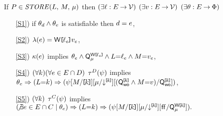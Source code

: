 \noindent
If $\aPS \in \sSTORE[\amode]{\cExp}{\aExp}$ then
$(\exists\ell:E\mathbin\rightarrow\mathcal{V})$
$(\exists v:E\mathbin\rightarrow\mathcal{V})$
$(\exists\theta:E\mathbin\rightarrow\Phi)$
\begin{enumerate}
\item[\ref{S1})] if $\theta_d\land\theta_e$ is satisfiable then $d=e$,
\item[\ref{S2})] $\labelingAct(\aEv) = \DWREF{\cVal_\aEv}{\aVal_\aEv}$,
\item[\ref{S3})] 
  $\kappa(e)$ implies
  \begin{math}
    \theta_e
    \land \smash{\mathsf{Q}_{\mu}^{\mathsf{W}\mkern-2mu\texttt{[}\mkern-2mu\ell_e \mkern-2mu\texttt{]}\mkern-2mu}}
    \land L{=}\ell_e
    \land M{=}v_e
  \end{math},
\item[\ref{S4})]
  \begin{math}
    (\forall k)
    (\forall e\in E\cap D)
  \end{math}
  $\aTr{\bEvs}{\bForm}$ \;implies \,
  \begin{math}
    \theta_e
    \Rightarrow (L{=}k)
    \Rightarrow (
      \psi
      [M/\mkern-2mu\texttt{[}\mkern-2muk \mkern-2mu\texttt{]}\mkern-2mu]
      {[}{\mu}/\mathord{\downarrow^{\mkern-2mu\texttt{[}\mkern-2muk \mkern-2mu\texttt{]}\mkern-2mu}}{]}
      [(\mathsf{Q}_{\mathsf{wo}}^{\mkern-2mu\texttt{[}\mkern-2muk \mkern-2mu\texttt{]}\mkern-2mu}\land M{=}v)/\mathsf{Q}_{\mathsf{wo}}^{\mkern-2mu\texttt{[}\mkern-2muk \mkern-2mu\texttt{]}\mkern-2mu}]
    )
  \end{math},
\item[\ref{S5})] %
  \begin{math}
    (\forall k)
  \end{math}
  $\aTr{\cEvs}{\bForm}$ implies
  \begin{math}
    (\!\not\exists e\in E\cap C \mid \theta_e)
    \Rightarrow (L{=}k)
    \Rightarrow (
      \psi
      [M/\mkern-2mu\texttt{[}\mkern-2muk \mkern-2mu\texttt{]}\mkern-2mu]
      {[}{\mu}/\mathord{\downarrow^{\mkern-2mu\texttt{[}\mkern-2muk \mkern-2mu\texttt{]}\mkern-2mu}}{]}
      [\mkern.6mu\mathsf{ff}\mkern.6mu/\smash{\mathsf{Q}_{\mu}^{\mathsf{W}\mkern-2mu\texttt{[}\mkern-2muk \mkern-2mu\texttt{]}\mkern-2mu}}]
    ).
  \end{math}
\end{enumerate}
